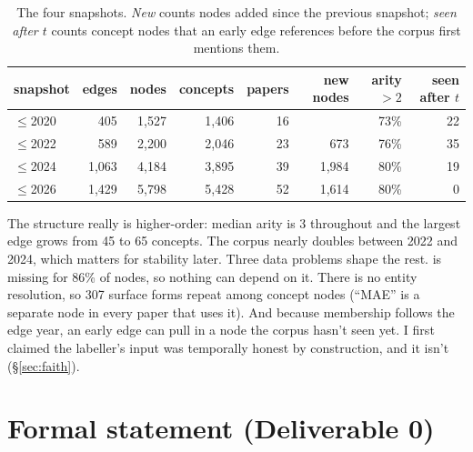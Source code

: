 \documentclass[10pt,a4paper]{article}
\newcommand{\code}[1]{\texttt{\small\detokenize{#1}}}
\begin{document}
\begin{table}[h]
\centering\small
\caption{The four snapshots. \emph{New} counts nodes added since the previous snapshot; \emph{seen
after $t$} counts concept nodes that an early edge references before the corpus first mentions them.}
\label{tab:snapshots}
\begin{tabular}{@{}lrrrrrrr@{}}
\toprule
snapshot & edges & nodes & concepts & papers & new nodes & arity $>2$ & seen after $t$ \\
\midrule
$\le$2020 & 405   & 1,527 & 1,406 & 16 &       & 73\% & 22 \\
$\le$2022 & 589   & 2,200 & 2,046 & 23 & 673   & 76\% & 35 \\
$\le$2024 & 1,063 & 4,184 & 3,895 & 39 & 1,984 & 80\% & 19 \\
$\le$2026 & 1,429 & 5,798 & 5,428 & 52 & 1,614 & 80\% & 0  \\
\bottomrule
\end{tabular}
\end{table}

The structure really is higher-order: median arity is 3 throughout and the largest edge grows from 45 to
65 concepts. The corpus nearly doubles between 2022 and 2024, which matters for stability later. Three
data problems shape the rest. \code{origin_year} is missing for 86\% of nodes, so nothing can depend on
it. There is no entity resolution, so 307 surface forms repeat among concept nodes (``MAE'' is a
separate node in every paper that uses it). And because membership follows the edge year, an early edge
can pull in a node the corpus hasn't seen yet. I first claimed the labeller's input was temporally honest
by construction, and it isn't (§\ref{sec:faith}).

\section{Formal statement (Deliverable 0)}
\label{sec:formal}
\end{document}
